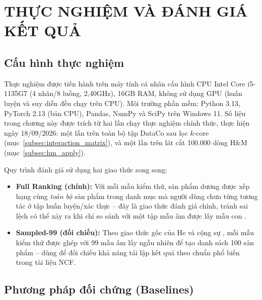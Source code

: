 \chapter{THỰC NGHIỆM VÀ ĐÁNH GIÁ KẾT QUẢ}
\label{chap:thucnghiem}

\section{Cấu hình thực nghiệm}
\label{sec:exp_config}

Thực nghiệm được tiến hành trên máy tính cá nhân cấu hình CPU Intel Core i5-1135G7 (4 nhân/8 luồng, 2,40GHz), 16GB RAM, không sử dụng GPU (huấn luyện và suy diễn đều chạy trên CPU). Môi trường phần mềm: Python 3.13, PyTorch 2.13 (bản CPU), Pandas, NumPy và SciPy trên Windows 11. Số liệu trong chương này được trích từ hai lần chạy thực nghiệm chính thức, thực hiện ngày 18/09/2026: một lần trên toàn bộ tập DataCo sau lọc $k$-core (mục~\ref{subsec:interaction_matrix}), và một lần trên lát cắt 100.000 dòng H\&M (mục~\ref{subsec:hm_apply}).

Quy trình đánh giá sử dụng hai giao thức song song:
\begin{itemize}
    \item \textbf{Full Ranking (chính):} Với mỗi mẫu kiểm thử, sản phẩm dương được xếp hạng cùng \emph{toàn bộ} sản phẩm trong danh mục mà người dùng chưa từng tương tác ở tập huấn luyện/xác thực -- đây là giao thức đánh giá chính, tránh sai lệch có thể xảy ra khi chỉ so sánh với một tập mẫu âm được lấy mẫu con \parencite{krichene2020sampled}.
    \item \textbf{Sampled-99 (đối chiếu):} Theo giao thức gốc của He và cộng sự \parencite{he2017ncf}, mỗi mẫu kiểm thử được ghép với 99 mẫu âm lấy ngẫu nhiên để tạo danh sách 100 sản phẩm -- dùng để đối chiếu khả năng tái lập kết quả theo chuẩn phổ biến trong tài liệu NCF.
\end{itemize}

\section{Phương pháp đối chứng (Baselines)}
\label{sec:baselines}

